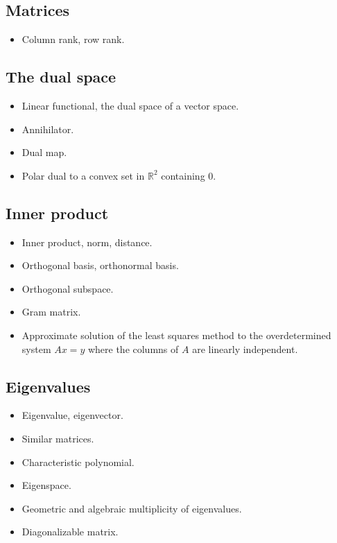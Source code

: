 \documentclass[12pt]{article}
\begin{document}
\begin{multicols}{2}
\subsection{Matrices}

\begin{itemize}
    \item Column rank, row rank.
\end{itemize}


\subsection{The dual space}

\begin{itemize}
    \item Linear functional, the dual space of a vector space.
    \item Annihilator.
    \item Dual map.
    \item Polar dual to a convex set in $\mathbb{R}^2$ containing
        $0$.
\end{itemize}


\subsection{Inner product}

\begin{itemize}
    \item Inner product, norm, distance.
    \item Orthogonal basis, orthonormal basis.
    \item Orthogonal subspace.
    \item Gram matrix.
    \item Approximate solution of the least squares method to the
        overdetermined system $Ax = y$ where the columns of $A$ are
        linearly independent.
\end{itemize}


\subsection{Eigenvalues}

\begin{itemize}
    \item Eigenvalue, eigenvector.
    \item Similar matrices.
    \item Characteristic polynomial.
    \item Eigenspace.
    \item Geometric and algebraic multiplicity of eigenvalues.
    \item Diagonalizable matrix.
\end{itemize}



\end{multicols}
\end{document}
